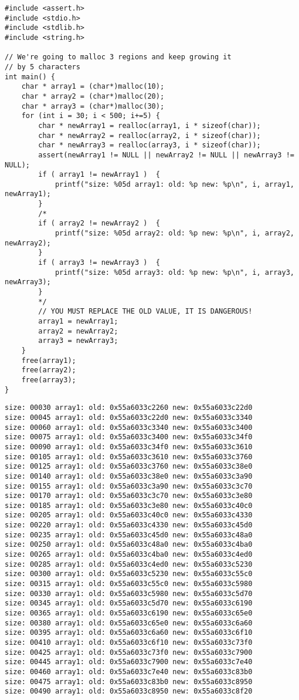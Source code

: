 \documentclass[11pt]{article}
\begin{document}
\begin{verbatim}
#include <assert.h>
#include <stdio.h>
#include <stdlib.h>
#include <string.h>

// We're going to malloc 3 regions and keep growing it
// by 5 characters
int main() {
    char * array1 = (char*)malloc(10);
    char * array2 = (char*)malloc(20);
    char * array3 = (char*)malloc(30);
    for (int i = 30; i < 500; i+=5) {
        char * newArray1 = realloc(array1, i * sizeof(char));
        char * newArray2 = realloc(array2, i * sizeof(char));
        char * newArray3 = realloc(array3, i * sizeof(char));
        assert(newArray1 != NULL || newArray2 != NULL || newArray3 != NULL);
        if ( array1 != newArray1 )  {
            printf("size: %05d array1: old: %p new: %p\n", i, array1, newArray1);
        }
        /*
        if ( array2 != newArray2 )  {
            printf("size: %05d array2: old: %p new: %p\n", i, array2, newArray2);
        }
        if ( array3 != newArray3 )  {
            printf("size: %05d array3: old: %p new: %p\n", i, array3, newArray3);
        }
        */
        // YOU MUST REPLACE THE OLD VALUE, IT IS DANGEROUS!
        array1 = newArray1;
        array2 = newArray2;
        array3 = newArray3;
    }
    free(array1);
    free(array2);
    free(array3);
}
\end{verbatim}

\begin{verbatim}
size: 00030 array1: old: 0x55a6033c2260 new: 0x55a6033c22d0
size: 00045 array1: old: 0x55a6033c22d0 new: 0x55a6033c3340
size: 00060 array1: old: 0x55a6033c3340 new: 0x55a6033c3400
size: 00075 array1: old: 0x55a6033c3400 new: 0x55a6033c34f0
size: 00090 array1: old: 0x55a6033c34f0 new: 0x55a6033c3610
size: 00105 array1: old: 0x55a6033c3610 new: 0x55a6033c3760
size: 00125 array1: old: 0x55a6033c3760 new: 0x55a6033c38e0
size: 00140 array1: old: 0x55a6033c38e0 new: 0x55a6033c3a90
size: 00155 array1: old: 0x55a6033c3a90 new: 0x55a6033c3c70
size: 00170 array1: old: 0x55a6033c3c70 new: 0x55a6033c3e80
size: 00185 array1: old: 0x55a6033c3e80 new: 0x55a6033c40c0
size: 00205 array1: old: 0x55a6033c40c0 new: 0x55a6033c4330
size: 00220 array1: old: 0x55a6033c4330 new: 0x55a6033c45d0
size: 00235 array1: old: 0x55a6033c45d0 new: 0x55a6033c48a0
size: 00250 array1: old: 0x55a6033c48a0 new: 0x55a6033c4ba0
size: 00265 array1: old: 0x55a6033c4ba0 new: 0x55a6033c4ed0
size: 00285 array1: old: 0x55a6033c4ed0 new: 0x55a6033c5230
size: 00300 array1: old: 0x55a6033c5230 new: 0x55a6033c55c0
size: 00315 array1: old: 0x55a6033c55c0 new: 0x55a6033c5980
size: 00330 array1: old: 0x55a6033c5980 new: 0x55a6033c5d70
size: 00345 array1: old: 0x55a6033c5d70 new: 0x55a6033c6190
size: 00365 array1: old: 0x55a6033c6190 new: 0x55a6033c65e0
size: 00380 array1: old: 0x55a6033c65e0 new: 0x55a6033c6a60
size: 00395 array1: old: 0x55a6033c6a60 new: 0x55a6033c6f10
size: 00410 array1: old: 0x55a6033c6f10 new: 0x55a6033c73f0
size: 00425 array1: old: 0x55a6033c73f0 new: 0x55a6033c7900
size: 00445 array1: old: 0x55a6033c7900 new: 0x55a6033c7e40
size: 00460 array1: old: 0x55a6033c7e40 new: 0x55a6033c83b0
size: 00475 array1: old: 0x55a6033c83b0 new: 0x55a6033c8950
size: 00490 array1: old: 0x55a6033c8950 new: 0x55a6033c8f20
\end{verbatim}
\end{document}
